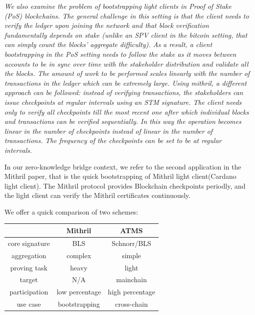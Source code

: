 \documentclass{article}
\begin{document}
\textit{We also examine the problem of bootstrapping light clients in Proof of Stake
(PoS) blockchains. The general challenge in this setting is that the client needs
to verify the ledger upon joining the network and that block verification fundamentally depends on stake (unlike an SPV client in the bitcoin setting, that can
simply count the blocks’ aggregate difficulty). As a result, a client bootstrapping
in the PoS setting needs to follow the stake as it moves between accounts to be
in sync over time with the stakeholder distribution and validate all the blocks.
The amount of work to be performed scales linearly with the number of transactions in the ledger which can be extremely large. Using mithril, a different
approach can be followed: instead of verifying transactions, the stakeholders can
issue checkpoints at regular intervals using an STM signature. The client needs
only to verify all checkpoints till the most recent one after which individual
blocks and transactions can be verified sequentially. In this way the operation
becomes linear in the number of checkpoints instead of linear in the number
of transactions. The frequency of the checkpoints can be set to be at regular
intervals.}

\vspace{0.3cm}

In our zero-knowledge bridge context, we refer to the second application in the Mithril paper, that is the quick bootstrapping of Mithril light client(Cardano light client). The Mithril protocol provides Blockchain checkpoints periodly, and the light client can verify the Mithril certificates continuously.

\vspace{0.3cm}

We offer a quick comparison of two schemes:

\begin{table}[htbp]
    \centering
    \renewcommand{\arraystretch}{1.1} %
    \setlength{\tabcolsep}{10pt}      %
    \begin{tabular}{c|c|c} \hline
         & \textbf{Mithril} & \textbf{ATMS}   \\ \hline
        core signature  & BLS  & Schnorr/BLS    \\
        aggregation & complex & simple \\
        proving task& heavy & light \\
        target& N/A &mainchain \\
        participation & low percentage & high percentage \\ 
        use case& bootstrapping & cross-chain \\ \hline
    \end{tabular}
    \label{tab:example_benchmark_selected}
\end{table}
\end{document}
